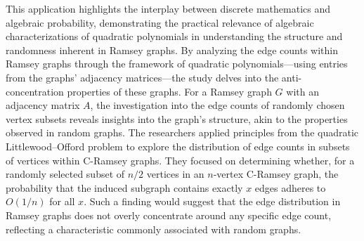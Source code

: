 This application highlights the interplay between discrete mathematics and algebraic probability, demonstrating the practical relevance of algebraic characterizations of quadratic polynomials in understanding the structure and randomness inherent in Ramsey graphs. By analyzing the edge counts within Ramsey graphs through the framework of quadratic polynomials—using entries from the graphs' adjacency matrices—the study delves into the anti-concentration properties of these graphs. For a Ramsey graph $G$ with an adjacency matrix $A$, the investigation into the edge counts of randomly chosen vertex subsets reveals insights into the graph's structure, akin to the properties observed in random graphs. The researchers applied principles from the quadratic Littlewood–Offord problem to explore the distribution of edge counts in subsets of vertices within C-Ramsey graphs. They focused on determining whether, for a randomly selected subset of $n/2$ vertices in an $n$-vertex C-Ramsey graph, the probability that the induced subgraph contains exactly $x$ edges adheres to $O(1/n)$ for all $x$. Such a finding would suggest that the edge distribution in Ramsey graphs does not overly concentrate around any specific edge count, reflecting a characteristic commonly associated with random graphs.
